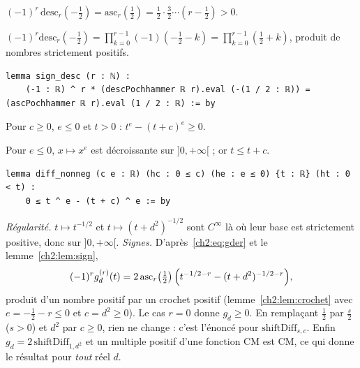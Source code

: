 \begin{lemma}[le signe]\label{ch2:lem:sign}
$(-1)^r\,\mathrm{desc}_r(-\tfrac12)=\mathrm{asc}_r(\tfrac12)=\tfrac12\cdot\tfrac32\cdots\left(r-\tfrac12\right)>0$.
\end{lemma}
\begin{humanproof}
$(-1)^r\mathrm{desc}_r(-\tfrac12)=\prod_{k=0}^{r-1}(-1)\left(-\tfrac12-k\right)=\prod_{k=0}^{r-1}\left(\tfrac12+k\right)$,
produit de nombres strictement positifs.
\end{humanproof}
\begin{leanbox}
\begin{lstlisting}[style=chdeux]
lemma sign_desc (r : ℕ) :
    (-1 : ℝ) ^ r * (descPochhammer ℝ r).eval (-(1 / 2 : ℝ)) = (ascPochhammer ℝ r).eval (1 / 2 : ℝ) := by
\end{lstlisting}
\end{leanbox}

\begin{lemma}[le crochet]\label{ch2:lem:crochet}
Pour $c\ge0$, $e\le0$ et $t>0$ : $t^e-(t+c)^e\ge0$.
\end{lemma}
\begin{humanproof}
Pour $e\le0$, $x\mapsto x^e$ est décroissante sur $]0,+\infty[$ ; or $t\le t+c$.
\end{humanproof}
\begin{leanbox}
\begin{lstlisting}[style=chdeux]
lemma diff_nonneg (c e : ℝ) (hc : 0 ≤ c) (he : e ≤ 0) {t : ℝ} (ht : 0 < t) :
    0 ≤ t ^ e - (t + c) ^ e := by
\end{lstlisting}
\end{leanbox}

\begin{humanproof}
\emph{Régularité.} $t\mapsto t^{-1/2}$ et $t\mapsto(t+d^2)^{-1/2}$ sont $C^\infty$ là où leur base est strictement
positive, donc sur $]0,+\infty[$.
\emph{Signes.} D'après~\eqref{ch2:eq:gder} et le lemme~\ref{ch2:lem:sign},
\[(-1)^rg_d^{(r)}(t)=2\,\mathrm{asc}_r\!\left(\tfrac12\right)\Bigl(t^{-1/2-r}-(t+d^2)^{-1/2-r}\Bigr),\]
produit d'un nombre positif par un crochet positif (lemme~\ref{ch2:lem:crochet} avec $e=-\tfrac12-r\le0$ et
$c=d^2\ge0$). Le cas $r=0$ donne $g_d\ge0$. En remplaçant $\tfrac12$ par $\tfrac s2$ ($s>0$) et $d^2$ par $c\ge0$, rien
ne change : c'est l'énoncé pour $\mathrm{shiftDiff}_{s,c}$. Enfin $g_d=2\,\mathrm{shiftDiff}_{1,d^2}$ et un multiple
positif d'une fonction CM est CM, ce qui donne le résultat pour \emph{tout} réel $d$.
\end{humanproof}

